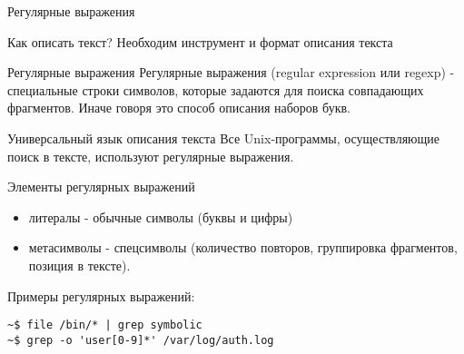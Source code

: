 
\begin{frame}{Регулярные выражения}

  \begin{block}{Как описать текст?}
    Необходим инструмент и формат описания текста
  \end{block} \pause

  \begin{block}{Регулярные выражения}
    \alert{Регулярные выражения (regular expression или regexp)} -  специальные строки символов, которые задаются для поиска совпадающих фрагментов. Иначе говоря это способ описания наборов букв.
  \end{block} \pause

  \begin{block}{Универсальный язык описания текста}
    Все Unix-программы, осуществляющие поиск в тексте, используют регулярные выражения.
  \end{block}

\end{frame}

\begin{frame}[fragile]{Элементы регулярных выражений}
    \begin{itemize}
      \item \alert{литералы} - обычные символы (буквы и цифры) \pause
      \item \alert{метасимволы} - спецсимволы (количество повторов, группировка фрагментов, позиция в тексте).
    \end{itemize} \pause

    Примеры регулярных выражений:\newline
\begin{lstlisting}
~$ file /bin/* | grep symbolic
~$ grep -o 'user[0-9]*' /var/log/auth.log
\end{lstlisting}
\end{frame}

